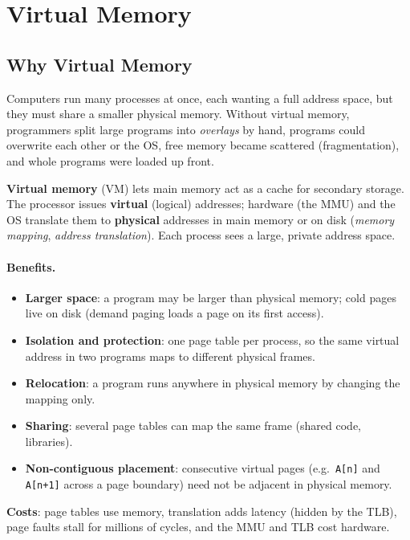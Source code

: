 \section{Virtual Memory}
\label{sec:vm}

\subsection{Why Virtual Memory}
\label{sec:vm-why}

Computers run many processes at once, each wanting a full address space, but
they must share a smaller physical memory. Without virtual memory, programmers
split large programs into \emph{overlays} by hand, programs could overwrite each
other or the OS, free memory became scattered (fragmentation), and whole programs
were loaded up front.

\begin{definition}
\textbf{Virtual memory} (VM) lets main memory act as a cache for secondary
storage. The processor issues \textbf{virtual} (logical) addresses; hardware (the
MMU) and the OS translate them to \textbf{physical} addresses in main memory or
on disk (\emph{memory mapping}, \emph{address translation}). Each process sees a
large, private address space.
\end{definition}

\paragraph{Benefits.}
\begin{itemize}
  \item \textbf{Larger space}: a program may be larger than physical memory; cold
  pages live on disk (demand paging loads a page on its first access).
  \item \textbf{Isolation and protection}: one page table per process, so the same
  virtual address in two programs maps to different physical frames.
  \item \textbf{Relocation}: a program runs anywhere in physical memory by changing
  the mapping only.
  \item \textbf{Sharing}: several page tables can map the same frame (shared code,
  libraries).
  \item \textbf{Non-contiguous placement}: consecutive virtual pages (e.g.\
  \texttt{A[n]} and \texttt{A[n+1]} across a page boundary) need not be adjacent in
  physical memory.
\end{itemize}
\textbf{Costs}: page tables use memory, translation adds latency (hidden by the
TLB), page faults stall for millions of cycles, and the MMU and TLB cost hardware.

